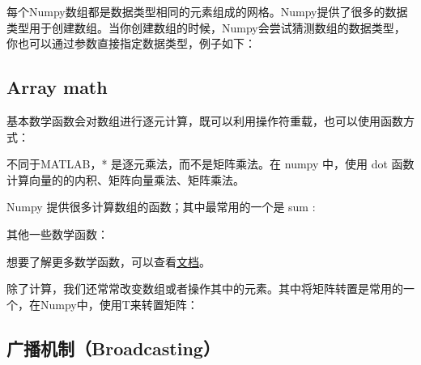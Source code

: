 每个Numpy数组都是数据类型相同的元素组成的网格。Numpy提供了很多的数据类型用于创建数组。当你创建数组的时候，Numpy会尝试猜测数组的数据类型，你也可以通过参数直接指定数据类型，例子如下：


\subsection{Array math}

基本数学函数会对数组进行逐元计算，既可以利用操作符重载，也可以使用函数方式：






不同于MATLAB，* 是逐元乘法，而不是矩阵乘法。在 numpy 中，使用 dot 函数计算向量的的内积、矩阵向量乘法、矩阵乘法。%






Numpy 提供很多计算数组的函数；其中最常用的一个是 sum :


其他一些数学函数：


想要了解更多数学函数，可以查看\href{http://docs.scipy.org/doc/numpy/reference/routines.math.html}{文档}。


除了计算，我们还常常改变数组或者操作其中的元素。其中将矩阵转置是常用的一个，在Numpy中，使用T来转置矩阵：



\subsection{广播机制（Broadcasting）}


